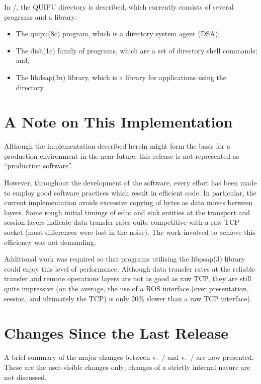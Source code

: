 In \volfive/,
the QUIPU directory is described,
which currently consists of several programs and a library:
\begin{itemize}
\item	The \man quipu(8c) program,
	which is a directory system agent (DSA);

\item	The \man dish(1c) family of programs,
	which are a set of directory shell commands;
	and,

\item	The \man libdsap(3n) library,
	which is a library for applications using the directory.
\end{itemize}

\section	{A Note on This Implementation}
Although the implementation described herein might form the basis for a
production environment in the near future,
this release is not represented as ``production software''.

However,
throughout the development of the software,
every effort has been made to employ good software practices which result in
efficient code.
In particular,
the current implementation avoids excessive copying of bytes as data moves
between layers.
Some rough initial timings of echo and sink entities at the transport and
session layers indicate data transfer rates quite competitive with a raw TCP
socket (most differences were lost in the noise).
The work involved to achieve this efficiency was not demanding.

Additional work was required so that programs utilising the \man libpsap(3)
library could enjoy this level of performance.
Although data transfer rates at the reliable transfer and remote operations
layers are not as good as raw TCP,
they are still quite impressive
(on the average,
the use of a ROS interface (over presentation, session, and ultimately the TCP)
is only 20\% slower than a raw TCP interface).

\section	{Changes Since the Last Release}\label{isode:changes}
A brief summary of the major changes between v.~\isodeprevrsn/ and v.~\isodevrsn/
are now presented.
These are the user-visible changes only;
changes of a strictly internal nature are not discussed.

